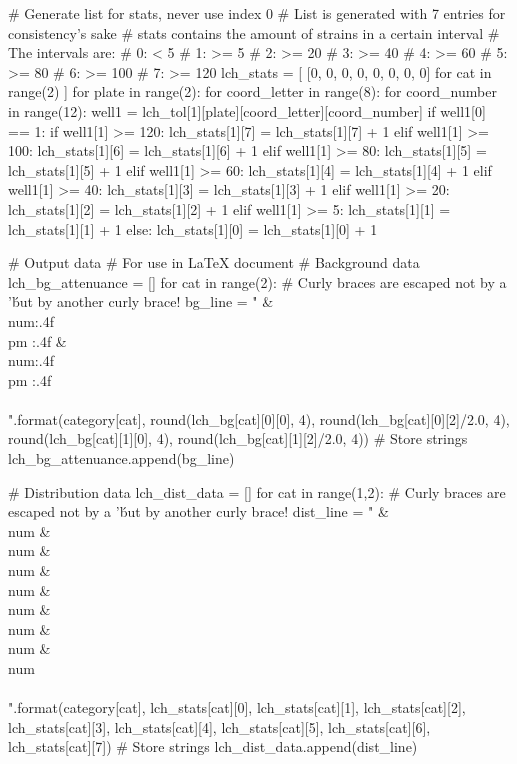 \begin{pycode}
# Generate list for stats, never use index 0
# List is generated with 7 entries for consistency's sake
# stats contains the amount of strains in a certain interval
# The intervals are:
# 0:  <   5%
# 1: >=   5%
# 2: >=  20%
# 3: >=  40%
# 4: >=  60%
# 5: >=  80%
# 6: >= 100%
# 7: >= 120%
lch_stats = [ [0, 0, 0, 0, 0, 0, 0, 0] for cat in range(2) ]
for plate in range(2):
    for coord_letter in range(8):
        for coord_number in range(12):
            well1 = lch_tol[1][plate][coord_letter][coord_number]
            if well1[0] == 1:
                if well1[1] >= 120:
                    lch_stats[1][7] = lch_stats[1][7] + 1
                elif well1[1] >= 100:
                    lch_stats[1][6] = lch_stats[1][6] + 1
                elif well1[1] >= 80:
                    lch_stats[1][5] = lch_stats[1][5] + 1
                elif well1[1] >= 60:
                    lch_stats[1][4] = lch_stats[1][4] + 1
                elif well1[1] >= 40:
                    lch_stats[1][3] = lch_stats[1][3] + 1
                elif well1[1] >= 20:
                    lch_stats[1][2] = lch_stats[1][2] + 1
                elif well1[1] >= 5:
                    lch_stats[1][1] = lch_stats[1][1] + 1
                else:
                    lch_stats[1][0] = lch_stats[1][0] + 1

# Output data
# For use in LaTeX document
# Background data
lch_bg_attenuance = []
for cat in range(2):
    # Curly braces are escaped not by a '\' but by another curly brace!
    bg_line = "{} & \\num{{{:.4f} \\pm {:.4f}}} & \\num{{{:.4f} \\pm {:.4f}}} \\\\".format(category[cat], round(lch_bg[cat][0][0], 4), round(lch_bg[cat][0][2]/2.0, 4), round(lch_bg[cat][1][0], 4), round(lch_bg[cat][1][2]/2.0, 4))
    # Store strings
    lch_bg_attenuance.append(bg_line)

# Distribution data
lch_dist_data = []
for cat in range(1,2):
    # Curly braces are escaped not by a '\' but by another curly brace!
    dist_line = "{} & \\num{{{}}} & \\num{{{}}} & \\num{{{}}} & \\num{{{}}} & \\num{{{}}} & \\num{{{}}} & \\num{{{}}} & \\num{{{}}} \\\\".format(category[cat], lch_stats[cat][0], lch_stats[cat][1], lch_stats[cat][2], lch_stats[cat][3], lch_stats[cat][4], lch_stats[cat][5], lch_stats[cat][6], lch_stats[cat][7])
    # Store strings
    lch_dist_data.append(dist_line)
\end{pycode}

